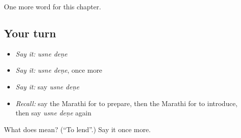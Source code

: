\begin{grammarlens}[title={What you've built}]
One more word for this chapter.
\end{grammarlens}

\subsection*{Your turn}
\begin{itemize}
\raggedright
  \item \emph{Say it:} \emph{usne deṇe}
  \item \emph{Say it:} \emph{usne deṇe}, once more
  \item \emph{Say it:} say \emph{usne deṇe}
  \item \emph{Recall:} say the Marathi for to prepare, then the Marathi for to introduce, then say \emph{usne deṇe} again
\end{itemize}

\begin{tcolorbox}[breakable,colback=teal!4,colframe=teal!35!black,title={Before you move on}]
What does   mean? (\textquotedblleft{}To lend\textquotedblright{}.) Say it once more.
\end{tcolorbox}
